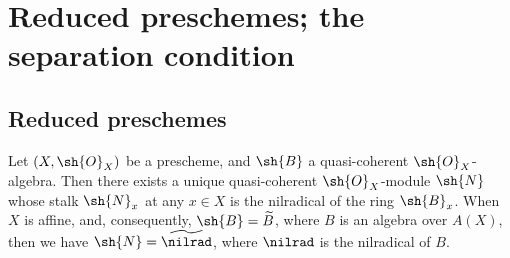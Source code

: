 \section{Reduced preschemes; the separation condition}
\label{section:I.5}

\subsection{Reduced preschemes}
\label{subsection:I.5.1}

\begin{proposition}[5.1.1]
\label{I.5.1.1}
Let $(X,\sh{O}_X)$ be a prescheme, and $\sh{B}$ a quasi-coherent $\sh{O}_X$-algebra.
Then there exists a unique quasi-coherent $\sh{O}_X$-module $\sh{N}$ whose stalk $\sh{N}_x$ at any $x\in X$ is the nilradical of the ring $\sh{B}_x$.
When $X$ is affine, and, consequently, $\sh{B}=\widetilde{B}$, where $B$ is an algebra over $A(X)$, then we have $\sh{N}=\widetilde{\nilrad}$, where $\nilrad$ is the nilradical of $B$.
\end{proposition}

